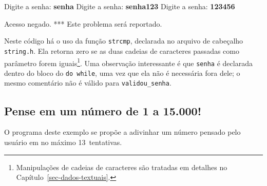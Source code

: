 \documentclass[
  11pt,
  a4paper,
]{scrbook}
\newenvironment{Shaded}{\begin{snugshade}}{\end{snugshade}}
\newcommand{\KeywordTok}[1]{\textcolor[rgb]{0.13,0.29,0.53}{\textbf{#1}}}
\newcommand{\NormalTok}[1]{#1}
\begin{document}
\begin{Shaded}
\begin{Highlighting}[]
\NormalTok{Digite a senha: }\KeywordTok{ senha }
\NormalTok{Digite a senha: }\KeywordTok{ senha123 }
\NormalTok{Digite a senha: }\KeywordTok{ 123456 }

\NormalTok{Acesso negado.}
\NormalTok{*** Este problema será reportado.}
\end{Highlighting}
\end{Shaded}

Neste código há o uso da função \texttt{strcmp}, declarada no arquivo de
cabeçalho \texttt{string.h}. Ela retorna zero se as duas cadeias de
caracteres passadas como parâmetro forem iguais\footnote{Manipulações de
  cadeias de caracteres são tratadas em detalhes no
  Capítulo~\ref{sec-dados-textuais}.}. Uma observação interessante é que
\texttt{senha} é declarada dentro do bloco do \texttt{do\ while}, uma
vez que ela não é necessária fora dele; o mesmo comentário não é válido
para \texttt{validou\_senha}.

\subsection{Pense em um número de 1 a
15.000!}\label{pense-em-um-nuxfamero-de-1-a-15.000}

O programa deste exemplo se propõe a adivinhar um número pensado pelo
usuário em no máximo 13~tentativas.
\end{document}
